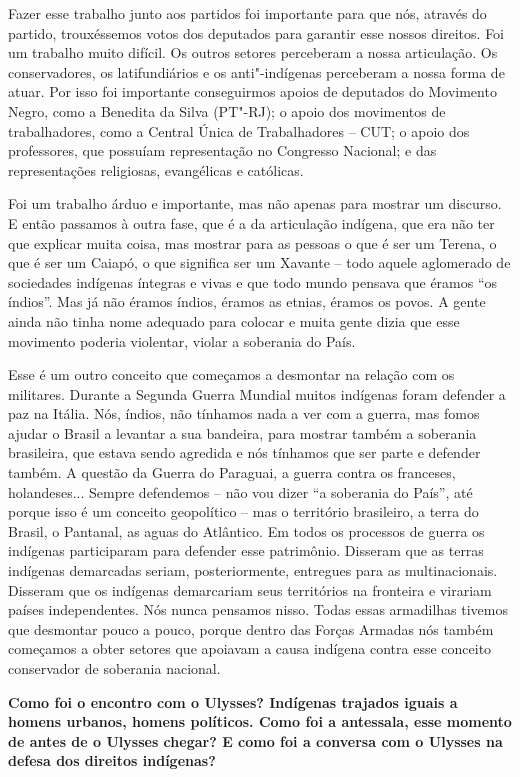 Fazer esse trabalho junto aos partidos foi importante para que nós,
através do partido, trouxéssemos votos dos deputados para garantir esse
nossos direitos. Foi um trabalho muito difícil. Os outros setores
perceberam a nossa articulação. Os conservadores, os latifundiários e os
anti"-indígenas perceberam a nossa forma de atuar. Por isso foi
importante conseguirmos apoios de deputados do Movimento Negro, como a
Benedita da Silva (PT"-RJ); o apoio dos movimentos de trabalhadores, como
a Central Única de Trabalhadores -- CUT; o apoio dos professores, que
possuíam representação no Congresso Nacional; e das representações
religiosas, evangélicas e católicas.

Foi um trabalho árduo e importante, mas não apenas para mostrar um
discurso. E então passamos à outra fase, que é a da articulação
indígena, que era não ter que explicar muita coisa, mas mostrar para as
pessoas o que é ser um Terena, o que é ser um Caiapó, o que significa
ser um Xavante -- todo aquele aglomerado de sociedades indígenas
íntegras e vivas e que todo mundo pensava que éramos ``os índios''. Mas
já não éramos índios, éramos as etnias, éramos os povos. A gente ainda
não tinha nome adequado para colocar e muita gente dizia que esse
movimento poderia violentar, violar a soberania do País.

Esse é um outro conceito que começamos a desmontar na relação com os
militares. Durante a Segunda Guerra Mundial muitos indígenas foram
defender a paz na Itália. Nós, índios, não tínhamos nada a ver com a
guerra, mas fomos ajudar o Brasil a levantar a sua bandeira, para
mostrar também a soberania brasileira, que estava sendo agredida e nós
tínhamos que ser parte e defender também. A questão da Guerra do
Paraguai, a guerra contra os franceses, holandeses... Sempre defendemos
-- não vou dizer ``a soberania do País'', até porque isso é um conceito
geopolítico -- mas o território brasileiro, a terra do Brasil, o
Pantanal, as aguas do Atlântico. Em todos os processos de guerra os
indígenas participaram para defender esse patrimônio. Disseram que as
terras indígenas demarcadas seriam, posteriormente, entregues para as
multinacionais. Disseram que os indígenas demarcariam seus territórios
na fronteira e virariam países independentes. Nós nunca pensamos nisso.
Todas essas armadilhas tivemos que desmontar pouco a pouco, porque
dentro das Forças Armadas nós também começamos a obter setores que
apoiavam a causa indígena contra esse conceito conservador de soberania
nacional.

\textbf{Como foi o encontro com o Ulysses? Indígenas trajados iguais a
homens urbanos, homens políticos. Como foi a antessala, esse momento de
antes de o Ulysses chegar? E como foi a conversa com o Ulysses na defesa
dos direitos indígenas?}


